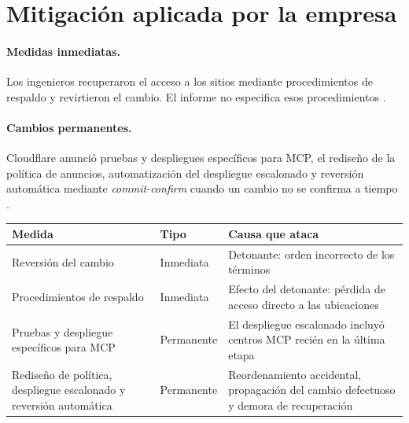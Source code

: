 \documentclass[10pt,a4paper]{article}
\begin{document}
\section{Mitigación aplicada por la empresa}
\paragraph{Medidas inmediatas.}
Los ingenieros recuperaron el acceso a los sitios mediante procedimientos de respaldo y revirtieron el cambio. El informe no especifica esos procedimientos \cite{cloudflare2022}.

\paragraph{Cambios permanentes.}
Cloudflare anunció pruebas y despliegues específicos para MCP, el rediseño de la política de anuncios, automatización del despliegue escalonado y reversión automática mediante \emph{commit-confirm} cuando un cambio no se confirma a tiempo \cite{cloudflare2022}.

\begin{bloquecentrado}
\small
\begin{tabularx}{\linewidth}{@{}>{\raggedright\arraybackslash}p{5.25cm}l>{\raggedright\arraybackslash}X@{}}
\toprule
Medida & Tipo & Causa que ataca \\
\midrule
Reversión del cambio & Inmediata & Detonante: orden incorrecto de los términos \cite{cloudflare2022} \\
Procedimientos de respaldo & Inmediata & Efecto del detonante: pérdida de acceso directo a las ubicaciones \cite{cloudflare2022} \\
Pruebas y despliegue específicos para MCP & Permanente & El despliegue escalonado incluyó centros MCP recién en la última etapa \cite{cloudflare2022} \\
Rediseño de política, despliegue escalonado y reversión automática
& Permanente
& Reordenamiento accidental, propagación del cambio defectuoso
y demora de recuperación \cite{cloudflare2022} \\\bottomrule
\end{tabularx}
\end{bloquecentrado}

\end{document}
